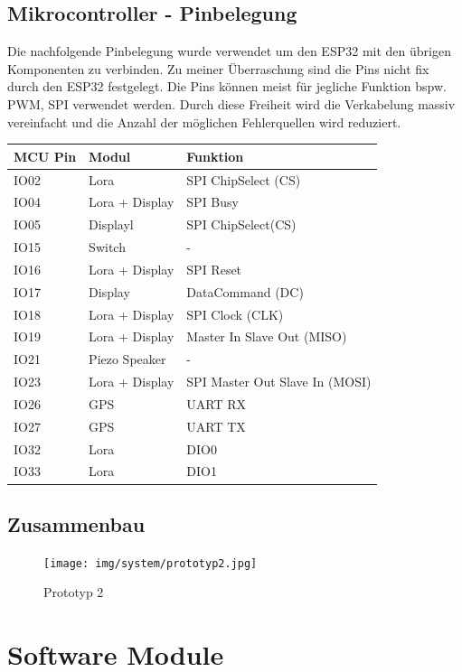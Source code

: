 \documentclass[11pt,english,german]{report}
\theoremstyle{definition}
\begin{document}
\newpage
\subsection{Mikrocontroller - Pinbelegung}
Die nachfolgende Pinbelegung wurde verwendet um den ESP32 mit den übrigen Komponenten zu verbinden. Zu meiner Überraschung sind die Pins nicht fix durch den ESP32 festgelegt. Die Pins können meist für jegliche Funktion bspw. PWM, SPI verwendet werden. Durch diese Freiheit wird die Verkabelung massiv vereinfacht und die Anzahl der möglichen Fehlerquellen wird reduziert.\\[0.5cm]
\begin{tabularx}{\textwidth}{ l|l|X }
	MCU Pin & Modul & Funktion\\ \hline
	IO02 & Lora & SPI ChipSelect (CS)\\\hline
	IO04 & Lora + Display& SPI Busy\\ \hline
	IO05 & Displayl& SPI ChipSelect(CS)\\\hline
	IO15 & Switch & -\\ \hline
	IO16 & Lora + Display & SPI Reset\\\hline
	IO17 & Display&  DataCommand (DC)\\ \hline
	IO18 & Lora + Display & SPI Clock (CLK)\\ \hline
	IO19 & Lora + Display & Master In Slave Out (MISO) \\\hline
	IO21 & Piezo Speaker & - \\ \hline
	IO23 & Lora + Display & SPI Master Out Slave In (MOSI) \\\hline
	IO26 & GPS & UART RX\\ \hline
	IO27 & GPS & UART TX\\ \hline
	IO32 & Lora & DIO0\\ \hline
	IO33 & Lora & DIO1\\ \hline
\end{tabularx}

\subsection{Zusammenbau}
\begin{figure}[H]
	\centering
	\texttt{[image: img/system/prototyp2.jpg]}
	\caption[Prototyp 2]
	{Prototyp 2}
\end{figure}


\newpage
\section{Software Module}
\end{document}
